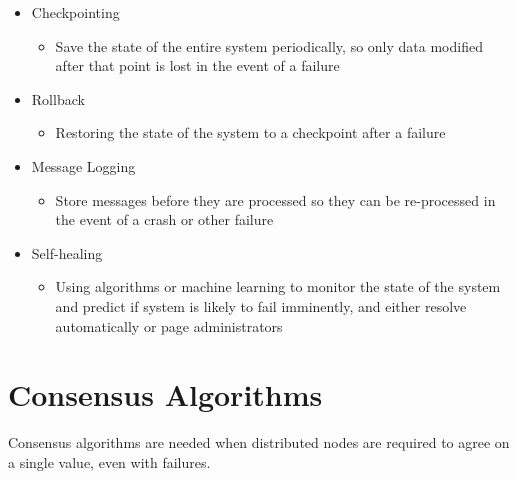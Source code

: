 \begin{itemize}
  \item Checkpointing
  \begin{itemize}
    \item Save the state of the entire system periodically, so only data modified after that point is lost in the event of a failure
  \end{itemize}
  \item Rollback
  \begin{itemize}
    \item Restoring the state of the system to a checkpoint after a failure
  \end{itemize}
  \item Message Logging
  \begin{itemize}
    \item Store messages before they are processed so they can be re-processed in the event of a crash or other failure
  \end{itemize}
  \item Self-healing
  \begin{itemize}
    \item Using algorithms or machine learning to monitor the state of the system and predict if system is likely to fail imminently, and either resolve automatically or page administrators
  \end{itemize}
\end{itemize}

\section*{Consensus Algorithms}

Consensus algorithms are needed when distributed nodes are required to agree on a single value, even with failures.

